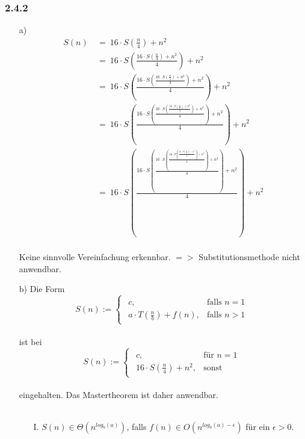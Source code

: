\documentclass{article}
\begin{document}
\subsubsection{2.4.2}
    \begin{enumerate}
        \item [a)]
        \[
            \begin{array}{ll}
                S(n)~&=~16 \cdot S(\frac{n}{4})+n^2\\
                &=~16 \cdot S(\frac{16 \cdot S(\frac{n}{4})+n^2}{4})+n^2\\
                &=~16 \cdot S(\frac{16 \cdot S(\frac{16 \cdot S(\frac{n}{4})+n^2}{4})+n^2}{4})+n^2\\
                &=~16 \cdot S(\frac{16 \cdot S(\frac{16 \cdot S(\frac{16 \cdot S(\frac{n}{4})+n^2}{4})+n^2}{4})+n^2}{4})+n^2\\
                &=~16 \cdot S(\frac{16 \cdot S(\frac{16 \cdot S(\frac{16 \cdot S(\frac{16 \cdot S(\frac{n}{4})+n^2}{4})+n^2}{4})+n^2}{4})+n^2}{4})+n^2
            \end{array}
        \]
        \\
        Keine sinnvolle Vereinfachung erkennbar. $=>$ Substitutionsmethode nicht anwendbar.
        \item [b)]
        Die Form\\
        \[
		S(n) :=  \begin{cases}
					\begin{array}{ll}
						c, & \text{falls }n=1\\
						a \cdot T(\frac{n}{b})+f(n), &\text{falls }n>1
					\end{array}
				\end{cases}
    	\]
    	\\
    	ist bei\\
    	\[
		S(n) := \begin{cases}
					\begin{array}{ll}
						c,			& \text{für }n=1\\
						16 \cdot S(\frac{n}{4})+n^2, & \text{sonst}
					\end{array}
				\end{cases}
    	\]
    	\\
    	eingehalten. Das Mastertheorem ist daher anwendbar.\\
    	\\
    	\begin{enumerate}
    	    \item[I.]
    	    $S(n) \in \Theta (n^{log_b(a)})$, falls $f(n) \in O(n^{log_b(a)- \epsilon})$ für ein $\epsilon > 0$.\\

\end{enumerate}
\end{enumerate}
\end{document}
